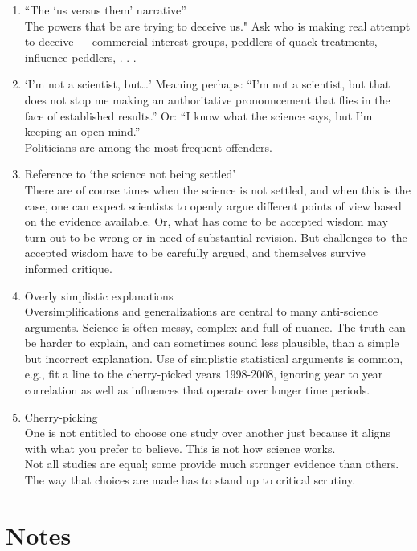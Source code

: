 \documentclass[
  10pt,
  b5paper]{book}
\providecommand{\tightlist}{%
  \setlength{\itemsep}{0pt}\setlength{\parskip}{0pt}}
\begin{document}
\begin{enumerate}
\def\labelenumi{\arabic{enumi}.}
\tightlist
\item
  ``The `us versus them' narrative''\\
  The powers that be are trying to deceive us." Ask who is
  making real attempt to deceive --- commercial interest groups,
  peddlers of quack treatments, influence peddlers, . . .
\item
  `I'm not a scientist, but\ldots{}'
  Meaning perhaps: ``I'm not a scientist, but that does not stop me
  making an authoritative pronouncement that flies in the face of
  established results.''
  Or: ``I know what the science says, but I'm keeping an open mind.''\\
  Politicians are among the most frequent offenders.
\item
  Reference to `the science not being settled'\\
  There are of course times when the science is not settled, and when this is
  the case, one can expect scientists to openly argue different points of view
  based on the evidence available. Or, what has come to be accepted wisdom
  may turn out to be wrong or in need of substantial revision. But challenges
  to~the accepted wisdom have to be carefully argued, and themselves survive
  informed critique.
\item
  Overly simplistic explanations\\
  Oversimplifications and generalizations are central to many anti-science
  arguments. Science is often messy, complex and full of nuance. The truth
  can be harder to explain, and can sometimes sound less plausible, than a
  simple but incorrect explanation. Use of simplistic statistical arguments
  is common, e.g., fit a line to the cherry-picked years 1998-2008, ignoring
  year to year correlation as well as influences that operate over longer time
  periods.
\item
  Cherry-picking\\
  One is not entitled to choose one study over another just because it aligns
  with what you prefer to believe. This is not how science works.\\
  Not all studies are equal; some provide much stronger evidence than others.
  The way that choices are made has to stand up to critical scrutiny.
\end{enumerate}

\hypertarget{notes}{%
\chapter{Notes}\label{notes}}
\end{document}
